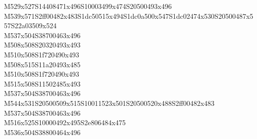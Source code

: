 \documentclass{article}
\begin{document}
\begin{multicols}{5}
\begin{center}
M529x527S14408471x496S10003499x474S20500493x496 %
\\M539x571S2ff00482x483S1dc50515x494S1dc0a500x547S1dc02474x530S20500487x557S22a03509x524 %
\\M537x504S38700463x496 %
\\M508x508S20320493x493 %
\\M510x508S1f720490x493 %
\\M508x515S11a20493x485 %
\\M510x508S1f720490x493 %
\\M515x508S11502485x493 %
\\M537x504S38700463x496 %
\\M544x531S20500509x515S10011523x501S20500520x488S2ff00482x483 %
\\M537x504S38700463x496 %
\\M516x525S10000492x495S2e806484x475 %
\\M536x504S38800464x496 %
\end{center}
\end{multicols}
\end{document}

